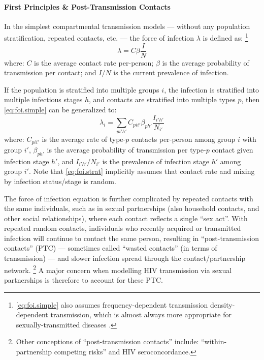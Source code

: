 \paragraph{First Principles \& Post-Transmission Contacts}
In the simplest compartmental transmission models
--- \ie without any population stratification, repeated contacts, etc. ---
the force of infection $\lambda$ is defined as:%
\footnote{\eqref{eq:foi.simple} also assumes
  frequency-dependent transmission \vs density-dependent transmission,
  which is almost always more appropriate for sexually-transmitted diseases \cite{Begon2002}.}
\begin{equation}\label{eq:foi.simple}
  \lambda = C \beta \frac{I}{N}
\end{equation} where:
$C$ is the average contact rate per-person;
$\beta$ is the average probability of transmission per contact; and
$I/N$ is the current prevalence of infection.
\par
If the population is stratified into multiple groups $i$,
the infection is stratified into multiple infectious stages $h$,
and contacts are stratified into multiple types $p$,
then \eqref{eq:foi.simple} can be generalized to:
\begin{equation}\label{eq:foi.strat}
  \lambda_i = \sum_{pi'h'} C_{pii'} \beta_{ph'} \frac{I_{i'h'}}{N_{i'}}
\end{equation}
where:
$C_{pii'}$ is the average rate of type-$p$ contacts per-person among group $i$ with group $i'$,
$\beta_{ph'}$ is the average probability of transmission per type-$p$ contact given infection stage $h'$,
and $I_{i'h'}/N_{i'}$ is the prevalence of infection stage $h'$ among group $i'$.
Note that \eqref{eq:foi.strat} implicitly assumes that
contact rate and mixing by infection status/stage is random.
\par
The force of infection equation is further complicated by
repeated contacts with the same individuals, such as in sexual partnerships
(also household contacts, and other social relationships),
where each contact reflects a single ``sex act''.
With repeated \vs random contacts, individuals who recently acquired or transmitted infection
will continue to contact the same person, resulting in ``post-transmission contacts'' (PTC)
--- sometimes called ``wasted contacts'' (in terms of transmission) ---
and slower infection spread through the contact/partnership network.%
\footnote{Other conceptions of ``post-transmission contacts'' include:
  ``within-partnership competing risks'' and HIV seroconcordance.}
A major concern when modelling HIV transmission via sexual partnerships
is therefore to account for these PTC.
